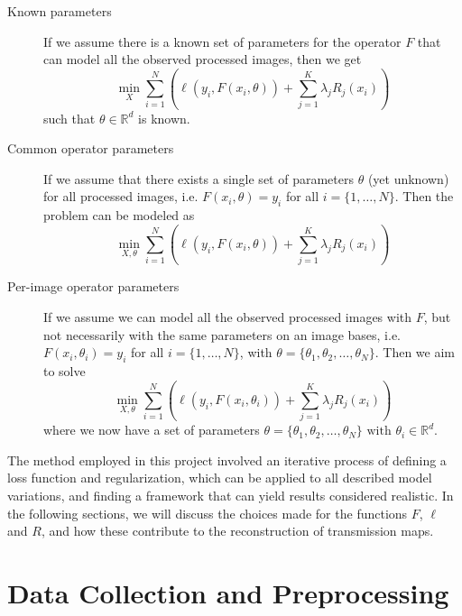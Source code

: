 \documentclass[nomenclature, english, bibtex]{kththesis}
\numberwithin{listing}{chapter}
\begin{document}
\begin{description}
    \item[Known parameters] If we assume there is a known set of parameters for the operator $F$ that can model all the observed processed images, then we get
    \begin{equation}
        \min_{X} \sum_{i=1}^{N} \left( \ell(y_i, F(x_i, \theta)) + \sum_{j = 1}^{K} \lambda_j R_j(x_i) \right)
    \end{equation}
    such that $\theta \in \mathbb{R}^d$ is known.
    \item[Common operator parameters] If we assume that there exists a single set of parameters $\theta$ (yet unknown) for all processed
    images, i.e. $F(x_i, \theta) = y_i$ for all $i = \{1,\dots,N\}$. Then the problem can be modeled as
    \begin{equation}
        \min_{X, \theta} \sum_{i=1}^{N} \left( \ell(y_i, F(x_i, \theta)) + \sum_{j = 1}^{K} \lambda_j R_j(x_i) \right)
    \end{equation}
    \item[Per-image operator parameters] If we assume we can model all the observed processed images with $F$, but not necessarily with the same parameters on an image bases,
    i.e. $F(x_i, \theta_i) = y_i$ for all $i = \{1,\dots,N\}$, with  $\theta = \{ \theta_1, \theta_2, \dots, \theta_N \}$. Then we aim to solve
    \begin{equation}
        \min_{X, \theta} \sum_{i=1}^{N} \left( \ell(y_i, F(x_i, \theta_i)) + \sum_{j = 1}^{K} \lambda_j R_j(x_i) \right)
    \end{equation}
    where we now have a set of parameters $\theta = \{\theta_1, \theta_2, \dots, \theta_N\} \text{ with }\theta_i \in \mathbb{R}^{d}$.
\end{description}


The method employed in this project involved an iterative process of defining a loss function and regularization,
which can be applied to all described model variations, and finding a framework that can yield results considered realistic.
In the following sections, we will discuss the choices made for the functions $F$, $\ell$ and $R$, and how these contribute
to the reconstruction of transmission maps.

\section{Data Collection and Preprocessing}
\label{sec:dataCollection}
\end{document}

